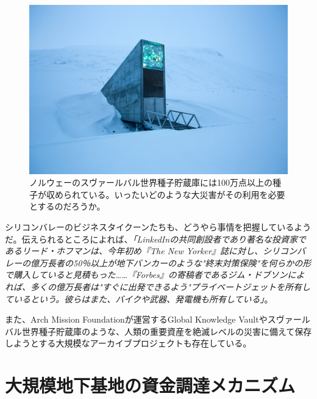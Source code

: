 \documentclass[10pt,twocolumn,letterpaper]{article}
\begin{document}
\begin{figure}[t]
\begin{center}
   \includegraphics[width=1\linewidth]{svalbard.jpg}
\end{center}
   \caption{ノルウェーのスヴァールバル世界種子貯蔵庫には100万点以上の種子が収められている\cite{24}。いったいどのような大災害がその利用を必要とするのだろうか。}
\label{fig:8}
\label{fig:onecol}
\end{figure}

シリコンバレーのビジネスタイクーンたちも、どうやら事情を把握しているようだ。伝えられるところによれば、\textit{「LinkedInの共同創設者であり著名な投資家であるリード・ホフマンは、今年初め『The New Yorker』誌に対し、シリコンバレーの億万長者の50％以上が地下バンカーのような"終末対策保険"を何らかの形で購入していると見積もった……『Forbes』の寄稿者であるジム・ドブソンによれば、多くの億万長者は"すぐに出発できるよう"プライベートジェットを所有しているという。彼らはまた、バイクや武器、発電機も所有している」}\cite{28}。

また、Arch Mission Foundationが運営するGlobal Knowledge Vault\cite{29}やスヴァールバル世界種子貯蔵庫\cite{30}のような、人類の重要資産を絶滅レベルの災害に備えて保存しようとする大規模なアーカイブプロジェクトも存在している。

\section{大規模地下基地の資金調達メカニズム}
\end{document}
